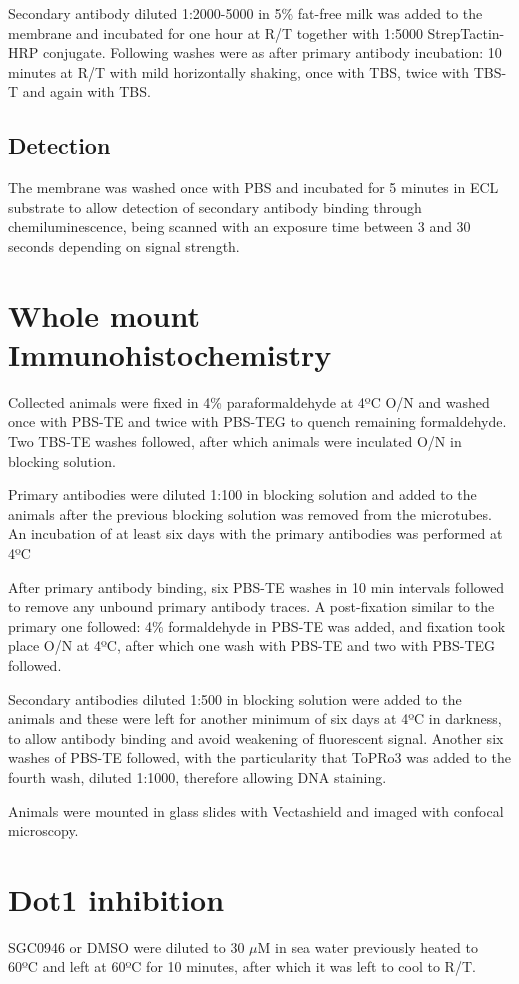 \documentclass[11pt,twoside,a4paper]{report}
\begin{document}
			Secondary antibody diluted 1:2000-5000 in 5\% fat-free milk was added to the membrane and incubated for one hour at R/T together with 1:5000 StrepTactin-HRP conjugate. Following washes were as after primary antibody incubation: 10 minutes at R/T with mild horizontally shaking, once with TBS, twice with TBS-T and again with TBS.
			\subsection{Detection}
			The membrane was washed once with PBS and incubated for 5 minutes in ECL substrate to allow detection of secondary antibody binding through chemiluminescence, being scanned with an exposure time between 3 and 30 seconds depending on signal strength.
		
	\section{Whole mount Immunohistochemistry}
		Collected animals were fixed in 4\% paraformaldehyde at 4ºC O/N and washed once with PBS-TE and twice with PBS-TEG to quench remaining formaldehyde. Two TBS-TE washes followed, after which animals were inculated O/N in blocking solution.
		
		Primary antibodies were diluted 1:100 in blocking solution and added to the animals after the previous blocking solution was removed from the microtubes. An incubation of at least six days with the primary antibodies was performed at 4ºC
		
		After primary antibody binding, six PBS-TE washes in 10 min intervals followed to remove any unbound primary antibody traces. A post-fixation similar to the primary one followed: 4\% formaldehyde in PBS-TE was added, and fixation took place O/N at 4ºC, after which one wash with PBS-TE and two with PBS-TEG followed. 
		
		Secondary antibodies diluted 1:500 in blocking solution were added to the animals  and these were left for another minimum of six days at 4ºC in darkness, to allow antibody binding and avoid weakening of fluorescent signal. Another six washes of PBS-TE followed, with the particularity that ToPRo3 was added to the fourth wash, diluted 1:1000, therefore allowing DNA staining.
		
		Animals were mounted in glass slides with Vectashield and imaged with confocal microscopy.
	
	\section{Dot1 inhibition}
		SGC0946 or DMSO were diluted to 30 $\mu$M in sea water previously heated to 60ºC and left at 60ºC for 10 minutes, after which it was left to cool to R/T.
		
\end{document}

